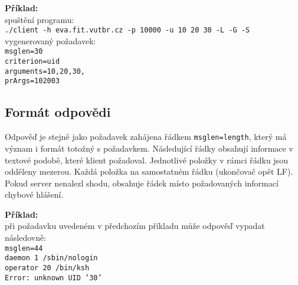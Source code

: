 \documentclass[a4paper, 11pt]{article}[31.03.2013]
\begin{document}
\noindent
{\bf Příklad:}\\
spuštění programu:\\
\texttt{./client -h eva.fit.vutbr.cz -p 10000 -u 10 20 30 -L -G -S}\\
vygenerovaný požadavek: \\
\texttt{msglen=30\\
criterion=uid\\
arguments=10,20,30,\\
prArgs=102003\\}

\subsection*{Formát odpovědi}
Odpověď je stejně jako požadavek zahájena řádkem \texttt{msglen=length}, který má význam
i formát totožný s požadavkem. Následující řádky obsahují informace v textové podobě,
které klient požadoval. Jednotlivé položky v rámci řádku jsou odděleny mezerou.
Každá položka na samostatném řádku (ukončovač opět LF). Pokud server
nenalezl shodu, obsahuje řádek místo požadovaných informací chybové hlášení.

\noindent
{\bf Příklad:}\\
při požadavku uvedeném v předchozím příkladu může odpověď vypadat následovně:\\
\texttt{msglen=44\\
daemon 1 /sbin/nologin\\
operator 20 /bin/ksh\\
Error: unknown UID '30'}
\end{document}
